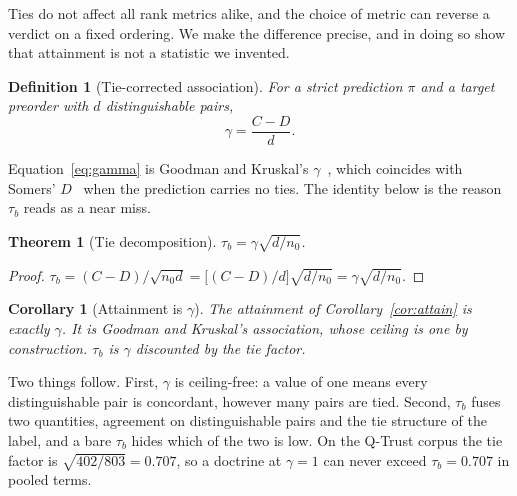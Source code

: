 \documentclass[journal,10pt]{IEEEtran}
\newtheorem{theorem}{Theorem}
\newtheorem{corollary}{Corollary}
\newtheorem{definition}{Definition}
\newcommand{\tb}{\tau_b}
\newcommand{\distinct}{d}
\newcommand{\nzero}{n_0}
\begin{document}
Ties do not affect all rank metrics alike, and the choice of metric can reverse a verdict on a
fixed ordering. We make the difference precise, and in doing so show that attainment is not a
statistic we invented.

\begin{definition}[Tie-corrected association]
For a strict prediction $\pi$ and a target preorder with $\distinct$ distinguishable pairs,
\begin{equation}
\gamma=\frac{C-D}{\distinct}.
\label{eq:gamma}
\end{equation}
\end{definition}

Equation~\eqref{eq:gamma} is Goodman and Kruskal's $\gamma$~\cite{goodman1954}, which coincides with
Somers' $D$~\cite{somers1962} when the prediction carries no ties. The identity below is the reason
$\tb$ reads as a near miss.

\begin{theorem}[Tie decomposition]
\label{thm:decomp}
$\tb=\gamma\sqrt{\distinct/\nzero}$.
\end{theorem}
\begin{proof}
$\tb=(C-D)/\sqrt{\nzero\distinct}=\bigl[(C-D)/\distinct\bigr]\sqrt{\distinct/\nzero}
=\gamma\sqrt{\distinct/\nzero}$.
\end{proof}

\begin{corollary}[Attainment is $\gamma$]
The attainment of Corollary~\ref{cor:attain} is exactly $\gamma$. It is Goodman and Kruskal's
association, whose ceiling is one by construction. $\tb$ is $\gamma$ discounted by the tie factor.
\end{corollary}

Two things follow. First, $\gamma$ is ceiling-free: a value of one means every distinguishable pair
is concordant, however many pairs are tied. Second, $\tb$ fuses two quantities, agreement on
distinguishable pairs and the tie structure of the label, and a bare $\tb$ hides which of the two
is low. On the Q-Trust corpus the tie factor is $\sqrt{402/803}=0.707$, so a doctrine at $\gamma=1$
can never exceed $\tb=0.707$ in pooled terms.
\end{document}
